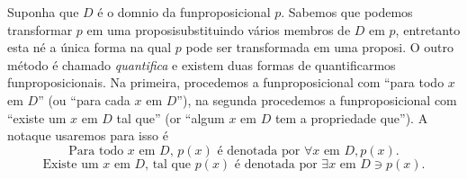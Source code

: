 Suponha que $D$ \'e o dom\ih nio da fun\cao proposicional $p$. Sabemos que podemos transformar $p$ em uma proposi\cao substituindo v\'arios membros de $D$ em $p$, entretanto esta n\ao \'e a \'unica forma na qual $p$ pode ser transformada em uma proposi\caoi. O outro m\'etodo \'e chamado \emph{quantifica\cao} e existem duas formas  de quantificarmos fun\coes proposicionais. Na primeira, procedemos a fun\cao proposicional com ``para todo $x$ em $D$'' (ou ``para cada $x$ em $D$''), na segunda procedemos a fun\cao proposicional com ``existe um $x$ em $D$ tal que'' (or ``algum $x$ em $D$ tem a propriedade que''). A nota\cao que usaremos para isso \'e
\[
\textrm{Para todo $x$ em $D$, $p(x)$ \'e denotada por $\forall x$ em $D, p(x).$}
\] 
\[
\textrm{Existe um $x$ em $D$, tal que $p(x)$ \'e denotada por $\exists x$ em $D \ni p(x).$}
\] 

